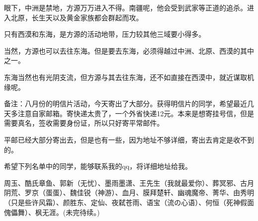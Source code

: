 \begin{this_body}
眼下，中洲是禁地，方源万万进入不得。南疆呢，他会受到武家等正道的追杀。进入北原，长生天以及黄金家族都会群起而攻。

只有西漠和东海，是方源的活动地带，压力较其他三域要小得多。

当然，方源也可以去往东海。但是要去东海，必须得越过中洲、北原、西漠的其中之一。

东海当然也有光阴支流，但方源与其去往东海，还不如直接在西漠中，就近谋取机缘呢。

备注：八月份的明信片活动，今天寄出了大部分。获得明信片的同学，希望最近几天多注意自家邮箱。寄快递太贵了，一个外省快递12元。本来是想寄挂号信，但是需要真名，签收需要身份证，所以只好寄平常邮件。

平邮已经大部分寄出去，但是也有一些，因为地址不够详细，寄出去肯定是收不到的。

希望下列名单中的同学，能够联系我的qq，将详细地址给我。

周玉、酷氏章鱼、郭新（无忧）、墨雨墨潇、王先生（我就最爱你）、葬冥邪、古月阴荒、罗京（蛋蛋）、魏佳锐（神游）、血月、膜拜楚轩、幽魂魔帝、菁华、由秀明（只是些许风霜）、颜胜东、定仙、夜弑苍雨、语宝（流の心语）、何恒（死神假面傀儡舞）、枫无涯。(未完待续。)

\end{this_body}

